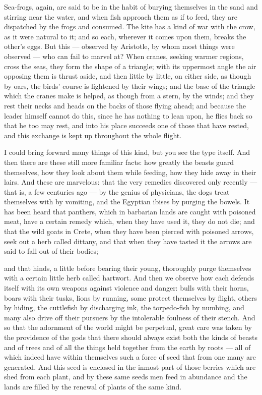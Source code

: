  Sea-frogs, again, are said to be in the habit of burying themselves in the sand and stirring near the water, and when fish approach them as if to feed, they are dispatched by the frogs and consumed. The kite has a kind of war with the crow, as it were natural to it; and so each, wherever it comes upon them, breaks the other's eggs. But this — observed by Aristotle, by whom most things were observed — who can fail to marvel at? When cranes, seeking warmer regions, cross the seas, they form the shape of a triangle; with its uppermost angle the air opposing them is thrust aside, and then little by little, on either side, as though by oars, the birds' course is lightened by their wings; and the base of the triangle which the cranes make is helped, as though from a stern, by the winds; and they rest their necks and heads on the backs of those flying ahead; and because the leader himself cannot do this, since he has nothing to lean upon, he flies back so that he too may rest, and into his place succeeds one of those that have rested, and this exchange is kept up throughout the whole flight.

 I could bring forward many things of this kind, but you see the type itself. And then there are these still more familiar facts: how greatly the beasts guard themselves, how they look about them while feeding, how they hide away in their lairs. And these are marvelous: that the very remedies discovered only recently — that is, a few centuries ago — by the genius of physicians, the dogs treat themselves with by vomiting, and the Egyptian ibises by purging the bowels. It has been heard that panthers, which in barbarian lands are caught with poisoned meat, have a certain remedy which, when they have used it, they do not die; and that the wild goats in Crete, when they have been pierced with poisoned arrows, seek out a herb called dittany, and that when they have tasted it the arrows are said to fall out of their bodies;

 and that hinds, a little before bearing their young, thoroughly purge themselves with a certain little herb called hartwort. And then we observe how each defends itself with its own weapons against violence and danger: bulls with their horns, boars with their tusks, lions by running, some protect themselves by flight, others by hiding, the cuttlefish by discharging ink, the torpedo-fish by numbing, and many also drive off their pursuers by the intolerable foulness of their stench. And so that the adornment of the world might be perpetual, great care was taken by the providence of the gods that there should always exist both the kinds of beasts and of trees and of all the things held together from the earth by roots — all of which indeed have within themselves such a force of seed that from one many are generated. And this seed is enclosed in the inmost part of those berries which are shed from each plant, and by these same seeds men feed in abundance and the lands are filled by the renewal of plants of the same kind.

